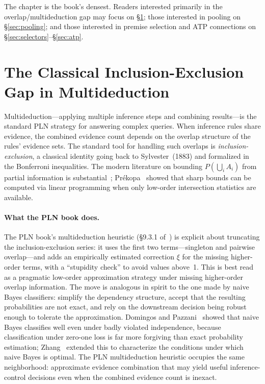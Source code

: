 \documentclass[11pt,openany]{report}
\begin{document}
\noindent
The chapter is the book's densest.  Readers interested primarily
in the overlap/multideduction gap may focus on
\S\ref{sec:multideduction}; those interested in pooling on
\S\ref{sec:pooling}; and those interested in premise selection
and ATP connections on \S\ref{sec:selectors}--\S\ref{sec:atp}.




\section{The Classical Inclusion-Exclusion Gap in Multideduction}
\label{sec:multideduction}

Multideduction---applying multiple inference steps and combining
results---is the standard PLN strategy for answering complex queries.
When inference rules share evidence, the combined evidence count
depends on the overlap structure of the rules' evidence sets.  The
standard tool for handling such overlaps is
\emph{inclusion-exclusion}, a classical identity going back to
Sylvester~(1883) and formalized in the Bonferroni inequalities.
The modern literature on bounding $P(\bigcup_i A_i)$ from partial
information is substantial~\cite{Hunter1976, KouniasSotirakoglou1989,
YangAlajaji2017}; Pr{\'e}kopa~\cite{Prekopa1988} showed that sharp
bounds can be computed via linear programming when only low-order
intersection statistics are available.

\paragraph{What the PLN book does.}
The PLN book's multideduction heuristic (\S9.3.1
of~\cite{goertzel2009pln}) is explicit about truncating the
inclusion-exclusion series: it uses the first two terms---singleton
and pairwise overlap---and adds an empirically estimated correction
$\xi$ for the missing higher-order terms, with a ``stupidity check''
to avoid values above~1.  This is best read as a pragmatic low-order approximation
strategy under missing higher-order overlap information.
The move is analogous in spirit to
the one made by naive Bayes classifiers: simplify the dependency
structure, accept that the resulting probabilities are not exact, and
rely on the downstream decision being robust enough to tolerate the
approximation.  Domingos and Pazzani~\cite{DomingosPazzani1997}
showed that naive Bayes classifies well even under badly violated
independence, because classification under zero-one loss is far more
forgiving than exact probability estimation; Zhang~\cite{Zhang2004NaiveBayes}
extended this to characterize the conditions under which naive Bayes
is optimal.  The PLN multideduction heuristic occupies the same
neighborhood: approximate evidence combination that may yield useful
inference-control decisions even when the combined evidence count is
inexact.
\end{document}
